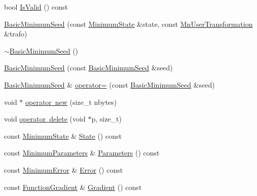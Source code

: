 \begin{DoxyCompactItemize}
\item 
bool \mbox{\hyperlink{classROOT_1_1Minuit2_1_1BasicMinimumSeed_ab53f2619d2b6be3d3d9303f8de29ab28}{Is\+Valid}} () const
\item 
\mbox{\hyperlink{classROOT_1_1Minuit2_1_1BasicMinimumSeed_aae0d1c36a05bf57a221d1930a9ffbb87}{Basic\+Minimum\+Seed}} (const \mbox{\hyperlink{classROOT_1_1Minuit2_1_1MinimumState}{Minimum\+State}} \&state, const \mbox{\hyperlink{classROOT_1_1Minuit2_1_1MnUserTransformation}{Mn\+User\+Transformation}} \&trafo)
\item 
\mbox{\hyperlink{classROOT_1_1Minuit2_1_1BasicMinimumSeed_ab0106865fff141f6f402cc934ea292d7}{$\sim$\+Basic\+Minimum\+Seed}} ()
\item 
\mbox{\hyperlink{classROOT_1_1Minuit2_1_1BasicMinimumSeed_a9bd68bcfd30880f67566bfd4f70a2ca6}{Basic\+Minimum\+Seed}} (const \mbox{\hyperlink{classROOT_1_1Minuit2_1_1BasicMinimumSeed}{Basic\+Minimum\+Seed}} \&seed)
\item 
\mbox{\hyperlink{classROOT_1_1Minuit2_1_1BasicMinimumSeed}{Basic\+Minimum\+Seed}} \& \mbox{\hyperlink{classROOT_1_1Minuit2_1_1BasicMinimumSeed_aeffefca123cbfd95d19fa7fb7e087431}{operator=}} (const \mbox{\hyperlink{classROOT_1_1Minuit2_1_1BasicMinimumSeed}{Basic\+Minimum\+Seed}} \&seed)
\item 
void $\ast$ \mbox{\hyperlink{classROOT_1_1Minuit2_1_1BasicMinimumSeed_ae9ee17ec0140aa209e488b064675f3c3}{operator new}} (size\+\_\+t nbytes)
\item 
void \mbox{\hyperlink{classROOT_1_1Minuit2_1_1BasicMinimumSeed_ae2af98f9f03cfe5e5202153b914ff120}{operator delete}} (void $\ast$p, size\+\_\+t)
\item 
const \mbox{\hyperlink{classROOT_1_1Minuit2_1_1MinimumState}{Minimum\+State}} \& \mbox{\hyperlink{classROOT_1_1Minuit2_1_1BasicMinimumSeed_a92e671b9a963d83076238c2e2b283e7c}{State}} () const
\item 
const \mbox{\hyperlink{classROOT_1_1Minuit2_1_1MinimumParameters}{Minimum\+Parameters}} \& \mbox{\hyperlink{classROOT_1_1Minuit2_1_1BasicMinimumSeed_a0aec3622cdc4f1c52a4be74f8b96059a}{Parameters}} () const
\item 
const \mbox{\hyperlink{classROOT_1_1Minuit2_1_1MinimumError}{Minimum\+Error}} \& \mbox{\hyperlink{classROOT_1_1Minuit2_1_1BasicMinimumSeed_a108de61cfe9f1766c3d7e251202a29df}{Error}} () const
\item 
const \mbox{\hyperlink{classROOT_1_1Minuit2_1_1FunctionGradient}{Function\+Gradient}} \& \mbox{\hyperlink{classROOT_1_1Minuit2_1_1BasicMinimumSeed_ab61377b63a177c93629ccb3e69e173db}{Gradient}} () const

\end{DoxyCompactItemize}
